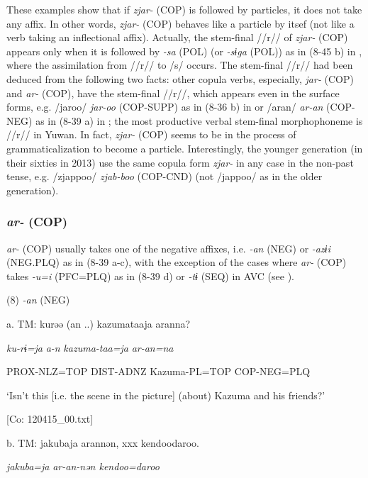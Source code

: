 These examples show that if \textit{zjar-} (COP) is followed by particles, it does not take any affix. In other words, \textit{zjar-} (COP) behaves like a particle by itsef (not like a verb taking an inflectional affix). Actually, the stem-final //r// of \textit{zjar-} (COP) appears only when it is followed by \textit{{}-sa} (POL) (or \textit{{}-sɨga} (POL)) as in (8-45 b) in , where the assimilation from //r// to /s/ occurs. The stem-final //r// had been deduced from the following two facts:  other copula verbs, especially, \textit{jar-} (COP) and \textit{ar-} (COP), have the stem-final //r//, which appears even in the surface forms, e.g. /jaroo/ \textit{jar-oo} (COP-SUPP) as in (8-36 b) in  or /aran/ \textit{ar-an} (COP-NEG) as in (8-39 a) in ;  the most productive verbal stem-final morphophoneme is //r// in Yuwan. In fact, \textit{zjar-} (COP) seems to be in the process of grammaticalization to become a particle. Interestingly, the younger generation (in their sixties in 2013) use the same copula form \textit{zjar-} in any case in the non-past tense, e.g. /zjappoo/ \textit{zjab-boo} (COP-CND) (not /jappoo/ as in the older generation).

\subsubsection{\textit{ar-} (COP)}

\textit{ar-} (COP) usually takes one of the negative affixes, i.e. \textit{{}-an} (NEG) or \textit{{}-azɨi} (NEG.PLQ) as in (8-39 a-c), with the exception of the cases where \textit{ar-} (COP) takes \textit{{}-u=i} (PFC=PLQ) as in (8-39 d) or \textit{{}-tɨ} (SEQ) in AVC (see ).

(8)  \textit{{}-an} (NEG)

  a.  TM:  kurəə  (an ..)  kazumataaja  aranna?

      \textit{ku-rɨ=ja}  \textit{a-n}  \textit{kazuma-taa=ja}  \textit{ar-an=na}

      PROX-NLZ=TOP  DIST-ADNZ  Kazuma-PL=TOP  COP-NEG=PLQ

      ‘Isn’t this [i.e. the scene in the picture] (about) Kazuma and his friends?’

      [Co: 120415\_00.txt]

  b.  TM:  jakubaja  arannən,  xxx  {\textbar}kendoo{\textbar}daroo.

      \textit{jakuba=ja}  \textit{ar-an{}-nən    kendoo=daroo}

